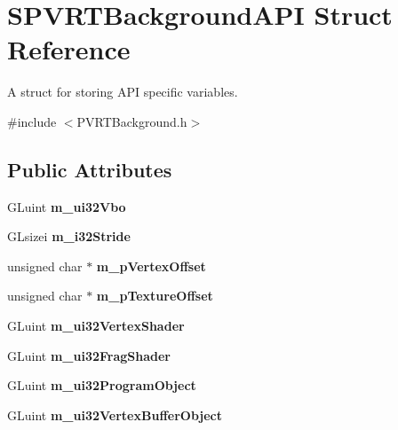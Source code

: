 \hypertarget{struct_s_p_v_r_t_background_a_p_i}{\section{S\+P\+V\+R\+T\+Background\+A\+P\+I Struct Reference}
\label{struct_s_p_v_r_t_background_a_p_i}
}


A struct for storing A\+P\+I specific variables.  




{\ttfamily \#include $<$P\+V\+R\+T\+Background.\+h$>$}

\subsection*{Public Attributes}
\begin{DoxyCompactItemize}
\item 
\hypertarget{struct_s_p_v_r_t_background_a_p_i_a186421d66c93dbee1c0362f22fec62b4}{G\+Luint {\bfseries m\+\_\+ui32\+Vbo}}\label{struct_s_p_v_r_t_background_a_p_i_a186421d66c93dbee1c0362f22fec62b4}

\item 
\hypertarget{struct_s_p_v_r_t_background_a_p_i_ab7b809957659f0b7f4b1db8ec825c313}{G\+Lsizei {\bfseries m\+\_\+i32\+Stride}}\label{struct_s_p_v_r_t_background_a_p_i_ab7b809957659f0b7f4b1db8ec825c313}

\item 
\hypertarget{struct_s_p_v_r_t_background_a_p_i_a2f38e9b7ef5499fca8030339dd3ca224}{unsigned char $\ast$ {\bfseries m\+\_\+p\+Vertex\+Offset}}\label{struct_s_p_v_r_t_background_a_p_i_a2f38e9b7ef5499fca8030339dd3ca224}

\item 
\hypertarget{struct_s_p_v_r_t_background_a_p_i_ae132da76edcd5214da22b361e4bb6681}{unsigned char $\ast$ {\bfseries m\+\_\+p\+Texture\+Offset}}\label{struct_s_p_v_r_t_background_a_p_i_ae132da76edcd5214da22b361e4bb6681}

\item 
\hypertarget{struct_s_p_v_r_t_background_a_p_i_aa9950bcfb1ec2c109265533986541793}{G\+Luint {\bfseries m\+\_\+ui32\+Vertex\+Shader}}\label{struct_s_p_v_r_t_background_a_p_i_aa9950bcfb1ec2c109265533986541793}

\item 
\hypertarget{struct_s_p_v_r_t_background_a_p_i_a30d8135632231280186c7a1f7a1523d7}{G\+Luint {\bfseries m\+\_\+ui32\+Frag\+Shader}}\label{struct_s_p_v_r_t_background_a_p_i_a30d8135632231280186c7a1f7a1523d7}

\item 
\hypertarget{struct_s_p_v_r_t_background_a_p_i_a3400681961c44fa6805f50d79d408ada}{G\+Luint {\bfseries m\+\_\+ui32\+Program\+Object}}\label{struct_s_p_v_r_t_background_a_p_i_a3400681961c44fa6805f50d79d408ada}

\item 
\hypertarget{struct_s_p_v_r_t_background_a_p_i_a6c542fcbfb6d76c139d4f7f81b6b498a}{G\+Luint {\bfseries m\+\_\+ui32\+Vertex\+Buffer\+Object}}\label{struct_s_p_v_r_t_background_a_p_i_a6c542fcbfb6d76c139d4f7f81b6b498a}

\end{DoxyCompactItemize}


